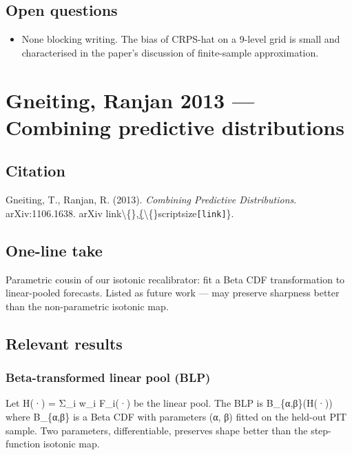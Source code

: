 \documentclass[11pt,a4paper,openany]{report}
\begin{document}
\section{Open questions}

\begin{itemize}
  \item None blocking writing. The bias of CRPS-hat on a 9-level grid is
    small and characterised in the paper's discussion of finite-sample
    approximation.
\end{itemize}

\chapter{Gneiting, Ranjan 2013 — Combining predictive distributions}

\section{Citation}

Gneiting, T., Ranjan, R. (2013). \emph{Combining Predictive Distributions}.
arXiv:1106.1638. arXiv link\textbackslash\{\},\href{https://arxiv.org/abs/1106.1638}\{\textbackslash\{\}scriptsize\texttt{[link]}\}.

\section{One-line take}

Parametric cousin of our isotonic recalibrator: fit a Beta CDF
transformation to linear-pooled forecasts. Listed as future work —
may preserve sharpness better than the non-parametric isotonic map.

\section{Relevant results}

\subsection{Beta-transformed linear pool (BLP)}

Let H(·) = Σ\_i w\_i F\_i(·) be the linear pool. The BLP is
B\_\{α,β\}(H(·)) where B\_\{α,β\} is a Beta CDF with parameters (α, β)
fitted on the held-out PIT sample. Two parameters, differentiable,
preserves shape better than the step-function isotonic map.
\end{document}
